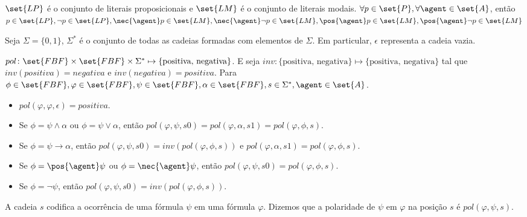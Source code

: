 
\begin{definition}
$\set{LP}$ é o conjunto de literais proposicionais e $\set{LM}$ é o conjunto de literais modais.
$\forall p \in \set{P}, \forall \agent \in \set{A}$, então $ p \in \set{LP}, \neg p \in \set{LP}, \nec{\agent} p \in \set{LM}, \nec{\agent} \neg p \in \set{LM}, \pos{\agent} p \in \set{LM}, \pos{\agent} \neg p \in \set{LM}$
\end{definition}

Seja $\Sigma = \{0, 1\}$, $\Sigma^*$ é o conjunto de todas as cadeias formadas com elementos de $\Sigma$. Em particular, $\epsilon$ representa a cadeia vazia.

\begin{definition}

$pol \colon \set{FBF} \times \set{FBF} \times \Sigma^* \mapsto \{\text{positiva, negativa}\}$. E seja $inv \colon \{\text{positiva, negativa}\} \mapsto \{\text{positiva, negativa}\}$ tal que $inv(positiva) = negativa$ e $inv(negativa) = positiva$. Para $\phi \in \set{FBF}, \varphi \in \set{FBF}, \psi \in \set{FBF}, \alpha \in \set{FBF}, s \in \Sigma^*, \agent \in \set{A}$.

\begin{itemize}
  \item[] $pol(\varphi, \varphi, \epsilon) = positiva$.
  \item[] Se $\phi = \psi \land \alpha$ ou $\phi = \psi \lor \alpha$, então $pol(\varphi, \psi, s0) = pol(\varphi, \alpha, s1) = pol(\varphi, \phi, s)$.
  \item[] Se $\phi = \psi \rightarrow \alpha$, então $pol(\varphi, \psi, s0) = inv(pol(\varphi, \phi, s))$ e $pol(\varphi, \alpha, s1) = pol(\varphi, \phi, s)$.
  \item[] Se $\phi = \pos{\agent}\psi$ ou $\phi = \nec{\agent}\psi$, então $pol(\varphi, \psi, s0) = pol(\varphi, \phi, s)$.
  \item[] Se $\phi = \neg\psi$, então $pol(\varphi, \psi, s0) = inv(pol(\varphi, \phi, s))$.
\end{itemize}

\end{definition}
A cadeia $s$ codifica a ocorrência de uma fórmula $\psi$ em uma fórmula $\varphi$.  Dizemos que a polaridade de $\psi$ em $\varphi$ na posição $s$ é $pol(\varphi, \psi, s)$.

